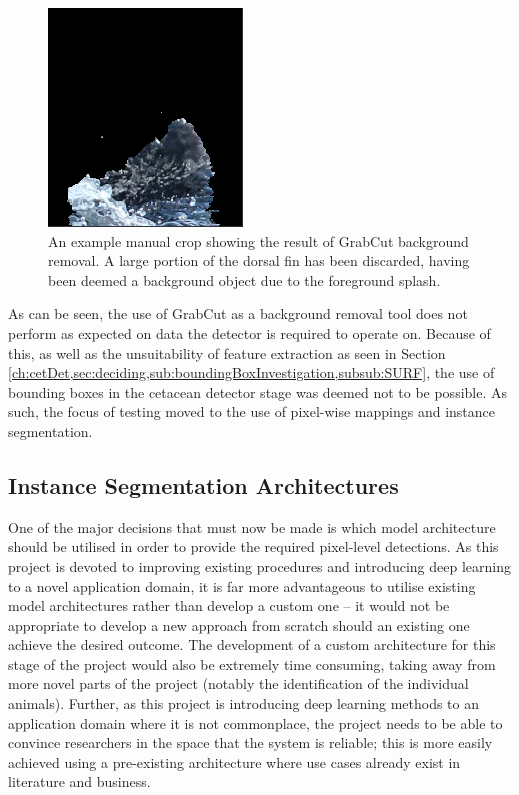 \begin{figure}
	\begin{center}
		\includegraphics[scale=0.6]{Chapter3/figs/grabcut-example.png}
	\end{center}
	\caption[An example manual crop showing the result of GrabCut background removal.]{An example manual crop showing the result of GrabCut background removal. A large portion of the dorsal fin has been discarded, having been deemed a background object due to the foreground splash.
	}
	\label{fig:grabcut-example}
\end{figure}

As can be seen, the use of GrabCut as a background removal tool does not perform as expected on data the detector is required to operate on. Because of this, as well as the unsuitability of feature extraction as seen in Section \ref{ch:cetDet,sec:deciding,sub:boundingBoxInvestigation,subsub:SURF}, the use of bounding boxes in the cetacean detector stage was deemed not to be possible. As such, the focus of testing moved to the use of pixel-wise mappings and instance segmentation.  

\subsection{Instance Segmentation Architectures}\label{ch:cetDet,sec:deciding,sub:instanceSegArchitectures}

One of the major decisions that must now be made is which model architecture should be utilised in order to provide the required pixel-level detections. As this project is devoted to improving existing procedures and introducing deep learning to a novel application domain, it is far more advantageous to utilise existing model architectures rather than develop a custom one -- it would not be appropriate to develop a new approach from scratch should an existing one achieve the desired outcome. The development of a custom architecture for this stage of the project would also be extremely time consuming, taking away from more novel parts of the project (notably the identification of the individual animals). Further, as this project is introducing deep learning methods to an application domain where it is not commonplace, the project needs to be able to convince researchers in the space that the system is reliable; this is more easily achieved using a pre-existing architecture where use cases already exist in literature and business. 

